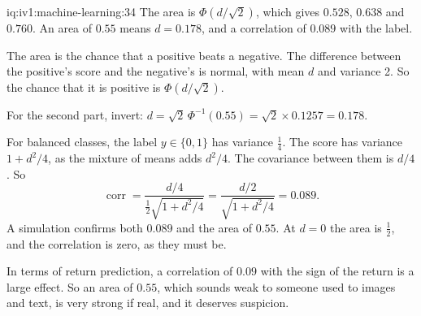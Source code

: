 \begin{solution}{iq:iv1:machine-learning:34}
The area is $\Phi(d/\sqrt{2})$, which gives $0.528$, $0.638$ and $0.760$. An area of $0.55$ means $d = 0.178$, and a correlation of $0.089$ with the label.

The area is the chance that a positive beats a negative. The difference between the positive's score and the negative's is normal, with mean $d$ and variance 2. So the chance that it is positive is $\Phi(d/\sqrt{2})$.

For the second part, invert: $d = \sqrt{2}\,\Phi^{-1}(0.55) = \sqrt{2} \times 0.1257 = 0.178$.

For balanced classes, the label $y \in \{0, 1\}$ has variance $\frac14$. The score has variance $1 + d^2/4$, as the mixture of means adds $d^2/4$. The covariance between them is $d/4$. So
\[
\operatorname{corr} = \frac{d/4}{\frac12\sqrt{1 + d^2/4}} = \frac{d/2}{\sqrt{1 + d^2/4}} = 0.089.
\]
A simulation confirms both $0.089$ and the area of $0.55$. At $d = 0$ the area is $\frac12$, and the correlation is zero, as they must be.

In terms of return prediction, a correlation of $0.09$ with the sign of the return is a large effect. So an area of $0.55$, which sounds weak to someone used to images and text, is very strong if real, and it deserves suspicion.



\end{solution}

